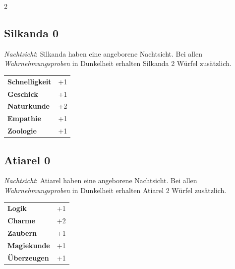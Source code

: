 \begin{multicols}{2}
\begin{tcolorbox}
\end{tcolorbox}

\begin{tcolorbox}
    \subsection*{Silkanda \hfill \small{0 }}
    \tcblower
\textit{Nachtsicht}: Silkanda haben eine angeborene Nachtsicht. Bei allen \textit{Wahrnehmungsproben} in Dunkelheit erhalten Silkanda 2 Würfel zusätzlich.


\vspace{3mm}

\begin{tabular}{@{}ll@{}}
    \textbf{Schnelligkeit} & +1\\
    \textbf{Geschick} & +1\\
    \textbf{Naturkunde} & +2\\
    \textbf{Empathie} & +1\\
    \textbf{Zoologie} & +1\\
\end{tabular}


\end{tcolorbox}

\begin{tcolorbox}
    \subsection*{Atiarel \hfill \small{0 }}
    \tcblower
\textit{Nachtsicht}: Atiarel haben eine angeborene Nachtsicht. Bei allen \textit{Wahrnehmungsproben} in Dunkelheit erhalten Atiarel 2 Würfel zusätzlich.


\vspace{3mm}

\begin{tabular}{@{}ll@{}}
    \textbf{Logik} & +1\\
    \textbf{Charme} & +2\\
    \textbf{Zaubern} & +1\\
    \textbf{Magiekunde} & +1\\
    \textbf{Überzeugen} & +1\\
\end{tabular}



\end{tcolorbox}
\end{multicols}
